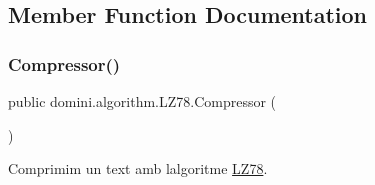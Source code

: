 \subsection{Member Function Documentation}
\mbox{\label{classdomini_1_1algorithm_1_1LZ78_a6ce2ce6b2ce14cbe5177f379becbb2d1}} 
\subsubsection{\texorpdfstring{Compressor()}{Compressor()}}
{\footnotesize\ttfamily public domini.\+algorithm.\+L\+Z78.\+Compressor (\begin{DoxyParamCaption}{ }\end{DoxyParamCaption})\hspace{0.3cm}{\ttfamily [inline]}}



Comprimim un text amb l\textquotesingle{}algoritme \hyperlink{classdomini_1_1algorithm_1_1LZ78}{L\+Z78}. 


